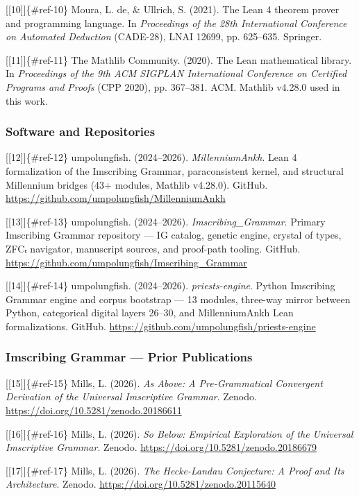 \documentclass[10pt,a4paper]{article}
\begin{document}
{[}{[}10{]}{]}\{\#ref-10\} Moura, L. de, \& Ullrich, S. (2021). The Lean 4 theorem prover and programming language. In \emph{Proceedings of the 28th International Conference on Automated Deduction} (CADE-28), LNAI 12699, pp. 625--635. Springer.

{[}{[}11{]}{]}\{\#ref-11\} The Mathlib Community. (2020). The Lean mathematical library. In \emph{Proceedings of the 9th ACM SIGPLAN International Conference on Certified Programs and Proofs} (CPP 2020), pp. 367--381. ACM. Mathlib v4.28.0 used in this work.

\subsubsection{Software and Repositories}

{[}{[}12{]}{]}\{\#ref-12\} umpolungfish. (2024--2026). \emph{MillenniumAnkh}. Lean 4 formalization of the Imscribing Grammar, paraconsistent kernel, and structural Millennium bridges (43+ modules, Mathlib v4.28.0). GitHub. \href{}{https://github.com/umpolungfish/MillenniumAnkh}

{[}{[}13{]}{]}\{\#ref-13\} umpolungfish. (2024--2026). \emph{Imscribing\_Grammar}. Primary Imscribing Grammar repository --- IG catalog, genetic engine, crystal of types, ZFCₜ navigator, manuscript sources, and proof-path tooling. GitHub. \href{}{https://github.com/umpolungfish/Imscribing\_Grammar}

{[}{[}14{]}{]}\{\#ref-14\} umpolungfish. (2024--2026). \emph{priests-engine}. Python Imscribing Grammar engine and corpus bootstrap --- 13 modules, three-way mirror between Python, categorical digital layers 26--30, and MillenniumAnkh Lean formalizations. GitHub. \href{}{https://github.com/umpolungfish/priests-engine}

\subsubsection{Imscribing Grammar --- Prior Publications}

{[}{[}15{]}{]}\{\#ref-15\} Mills, L. (2026). \emph{As Above: A Pre-Grammatical Convergent Derivation of the Universal Imscriptive Grammar}. Zenodo. \href{}{https://doi.org/10.5281/zenodo.20186611}

{[}{[}16{]}{]}\{\#ref-16\} Mills, L. (2026). \emph{So Below: Empirical Exploration of the Universal Imscriptive Grammar}. Zenodo. \href{}{https://doi.org/10.5281/zenodo.20186679}

{[}{[}17{]}{]}\{\#ref-17\} Mills, L. (2026). \emph{The Hecke-Landau Conjecture: A Proof and Its Architecture}. Zenodo. \href{}{https://doi.org/10.5281/zenodo.20115640}
\end{document}

